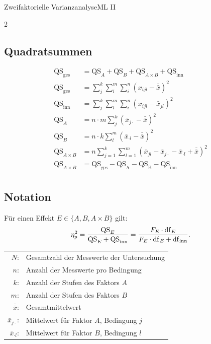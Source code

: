 \begin{formulaBox}{Zweifaktorielle Varianzanalyse}{ML II}
\begin{multicols}{2}
\subsection*{Quadratsummen}
\begin{align*}
\mathrm{QS}_{\mathrm{ges}}&=\mathrm{QS}_A+\mathrm{QS}_B+ \mathrm{QS}_{A\times B}+\mathrm{QS}_\mathrm{inn}\\
\mathrm{QS}_{\mathrm{ges}}&=\sum\limits_j^k \sum\limits_l^m \sum\limits_i^n (x_{ijl}-\bar{\bar{x}})^2\\
\mathrm{QS}_{\mathrm{inn}}&=\sum\limits_j^k \sum\limits_l^m \sum\limits_i^n(x_{ijl}-\bar{x}_{jl})^2\\
\mathrm{QS}_A&=n \cdot m \sum\limits_j^k (\bar{x}_{j\cdot}-\bar{\bar{x}})^2\\
\mathrm{QS}_B&= n \cdot k \sum\limits_l^m (\bar{x}_{\cdot l}-\bar{\bar{x}})^2\\
\mathrm{QS}_{A\times B}&= n \sum\limits_{j=1}^k \sum\limits_{l=1}^m \left( \bar{x}_{jl} - \bar{x}_{j\cdot} - \bar{x}_{\cdot l} + \bar{\bar{x}} \right)^2 \\
\mathrm{QS}_{A\times B}&=\mathrm{QS}_{\mathrm{ges}}-\mathrm{QS}_{\mathrm{A}}-\mathrm{QS}_{\mathrm{B}}-\mathrm{QS}_{\mathrm{inn}}\\
\end{align*}

\subsection*{Notation}
Für einen Effekt $E\in\{A,B,A\times B\}$ gilt:
\[
\eta_p^2=\frac{\mathrm{QS}_{E}}{\mathrm{QS}_{E}+\mathrm{QS}_{\mathrm{inn}}}
=\frac{F_E\cdot \mathrm{df}_E}{F_E\cdot \mathrm{df}_E+\mathrm{df}_{\mathrm{inn}}}.
\]

\begin{tabular}{rl}
$N$: &Gesamtzahl der Messwerte der Untersuchung \\
$n$: &Anzahl der Messwerte pro Bedingung \\
$k$: &Anzahl der Stufen des Faktors $A$\\
$m$: &Anzahl der Stufen des Faktors $B$\\
$\bar{\bar{x}}$: &Gesamtmittelwert\\
$\bar{x}_{j\cdot}$: &Mittelwert für Faktor $A$, Bedingung $j$\\
$\bar{x}_{\cdot l}$: &Mittelwert für Faktor $B$, Bedingung $l$\\
\end{tabular}
\end{multicols}


\end{formulaBox}
